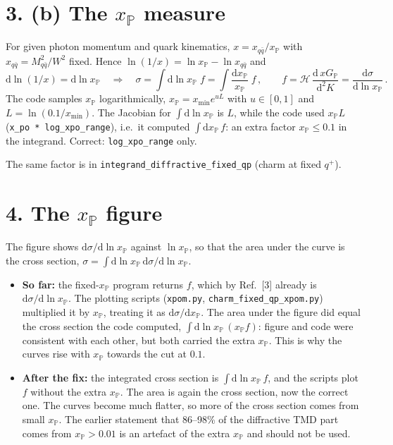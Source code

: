 \documentclass[12pt]{article}
\newcommand{\xpo}{x_{\mathbb{P}}}
\begin{document}
\section*{3. (b) The $\xpo$ measure}

For given photon momentum and quark kinematics, $x=x_{q\bar q}/\xpo$ with
$x_{q\bar q}=M_{q\bar q}^2/W^2$ fixed. Hence $\ln(1/x)=\ln\xpo-\ln x_{q\bar q}$ and
\[
  \mathrm{d}\ln(1/x)=\mathrm{d}\ln\xpo\quad\Longrightarrow\quad
  \sigma=\int\mathrm{d}\ln\xpo\;f=\int\frac{\mathrm{d}\xpo}{\xpo}\;f\,,\qquad
  f=\mathcal{H}\,\frac{\mathrm{d}\,xG_{\mathbb{P}}}{\mathrm{d}^2K}=\frac{\mathrm{d}\sigma}{\mathrm{d}\ln\xpo}\,.
\]
The code samples $\xpo$ logarithmically, $\xpo=x_{\min}e^{uL}$ with $u\in[0,1]$ and
$L=\ln(0.1/x_{\min})$. The Jacobian for $\int\mathrm{d}\ln\xpo$ is $L$, while the code used
$\xpo L$ (\texttt{x\_po * log\_xpo\_range}), i.e.\ it computed $\int\mathrm{d}\xpo\,f$: an extra factor
$\xpo\leq0.1$ in the integrand. Correct: \texttt{log\_xpo\_range} only.

The same factor is in \texttt{integrand\_diffractive\_fixed\_qp} (charm at fixed $q^+$).

\section*{4. The $\xpo$ figure}

The figure shows $\mathrm{d}\sigma/\mathrm{d}\ln\xpo$ against $\ln\xpo$, so that the area under the
curve is the cross section, $\sigma=\int\mathrm{d}\ln\xpo\,\mathrm{d}\sigma/\mathrm{d}\ln\xpo$.

\begin{itemize}
\item \textbf{So far:} the fixed-$\xpo$ program returns $f$, which by Ref.~[3] already is
  $\mathrm{d}\sigma/\mathrm{d}\ln\xpo$. The plotting scripts (\texttt{xpom.py},
  \texttt{charm\_fixed\_qp\_xpom.py}) multiplied it by $\xpo$, treating it as
  $\mathrm{d}\sigma/\mathrm{d}\xpo$. The area under the figure did equal the cross section the code
  computed, $\int\mathrm{d}\ln\xpo\,(\xpo f)$: figure and code were consistent with each other, but both
  carried the extra $\xpo$. This is why the curves rise with $\xpo$ towards the cut at $0.1$.
\item \textbf{After the fix:} the integrated cross section is $\int\mathrm{d}\ln\xpo\,f$, and the
  scripts plot $f$ without the extra $\xpo$. The area is again the cross section, now the correct one.
  The curves become much flatter, so more of the cross section comes from small $\xpo$. The earlier
  statement that 86--98\% of the diffractive TMD part comes from $\xpo>0.01$ is an artefact of the
  extra $\xpo$ and should not be used.
\end{itemize}
\end{document}
